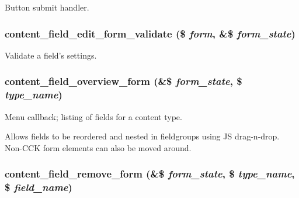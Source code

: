 Button submit handler. \hypertarget{content_8admin_8inc_2265266a939085829c717a0b61bb3a7e}{
\subsubsection[{content\_\-field\_\-edit\_\-form\_\-validate}]{\setlength{\rightskip}{0pt plus 5cm}content\_\-field\_\-edit\_\-form\_\-validate (\$ {\em form}, \/  \&\$ {\em form\_\-state})}}
\label{content_8admin_8inc_2265266a939085829c717a0b61bb3a7e}


Validate a field's settings. \hypertarget{content_8admin_8inc_ba934288bcc7dbc391d708cd023b56f4}{
\subsubsection[{content\_\-field\_\-overview\_\-form}]{\setlength{\rightskip}{0pt plus 5cm}content\_\-field\_\-overview\_\-form (\&\$ {\em form\_\-state}, \/  \$ {\em type\_\-name})}}
\label{content_8admin_8inc_ba934288bcc7dbc391d708cd023b56f4}


Menu callback; listing of fields for a content type.

Allows fields to be reordered and nested in fieldgroups using JS drag-n-drop. Non-CCK form elements can also be moved around. \hypertarget{content_8admin_8inc_26d040b449ba865d8a146e90eed14347}{
\subsubsection[{content\_\-field\_\-remove\_\-form}]{\setlength{\rightskip}{0pt plus 5cm}content\_\-field\_\-remove\_\-form (\&\$ {\em form\_\-state}, \/  \$ {\em type\_\-name}, \/  \$ {\em field\_\-name})}}
\label{content_8admin_8inc_26d040b449ba865d8a146e90eed14347}


